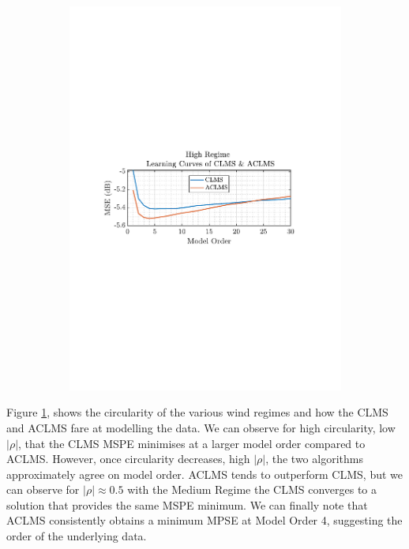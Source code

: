 \documentclass[12pt]{article}
\begin{document}
\begin{figure}[H]
\begin{subfigure}{0.49\textwidth}
					\includegraphics[trim={2.2cm 11.2cm 3.15cm  11.2cm}, clip, width=\textwidth]{../MATLAB/figures/q3_1b_fig07.pdf} 
				\end{subfigure}			
				\captionsetup{justification=centering}
				\label{fig: 3-1b}
			\end{figure}
		
		Figure \ref{fig: 3-1b}, shows the circularity of the various wind regimes and how the CLMS and ACLMS fare at modelling the data. We can observe for high circularity, low $|\rho|$, that the CLMS MSPE minimises at a larger model order compared to ACLMS. However, once circularity decreases, high $|\rho|$, the two algorithms approximately agree on model order. ACLMS tends to outperform CLMS, but we can observe for  $|\rho| \approx 0.5$ with the Medium Regime the CLMS converges to a solution that provides the same MSPE minimum. We can finally note that ACLMS consistently obtains a minimum MPSE at Model Order 4, suggesting the order of the underlying data.
	
\end{document}
